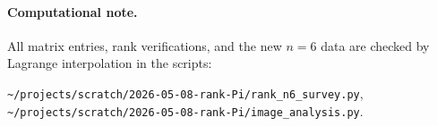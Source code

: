 \documentclass[11pt]{article}
\theoremstyle{definition}
\begin{document}
\paragraph{Computational note.} All matrix entries, rank verifications,
and the new $n = 6$ data are checked by Lagrange interpolation
in the scripts:
\begin{center}
\texttt{\textasciitilde/projects/scratch/2026-05-08-rank-Pi/rank\_n6\_survey.py},\\
\texttt{\textasciitilde/projects/scratch/2026-05-08-rank-Pi/image\_analysis.py}.
\end{center}
\end{document}
